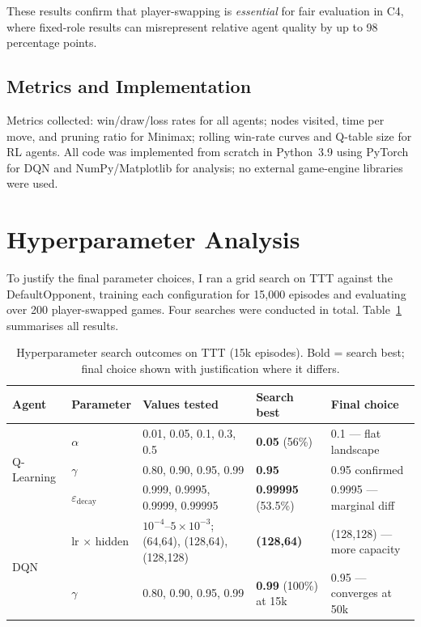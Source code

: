 \documentclass[11pt,a4paper]{article}
\begin{document}
These results confirm that player-swapping is \emph{essential} for fair evaluation in C4, where
fixed-role results can misrepresent relative agent quality by up to 98 percentage points.

\subsection{Metrics and Implementation}

Metrics collected: win/draw/loss rates for all agents; nodes visited, time per move, and pruning ratio for Minimax; rolling win-rate curves and Q-table size for RL agents. All code was implemented from scratch in Python~3.9 using PyTorch for DQN and NumPy/Matplotlib for analysis; no external game-engine libraries were used.

\section{Hyperparameter Analysis}
\label{sec:hyperparams}

To justify the final parameter choices, I ran a grid search on TTT against the DefaultOpponent,
training each configuration for 15,000 episodes and evaluating over 200 player-swapped games. Four
searches were conducted in total. Table~\ref{tab:hp_summary} summarises all results.

\begin{table}[H]
\centering
\caption{Hyperparameter search outcomes on TTT (15k episodes). Bold = search best; final choice
shown with justification where it differs.}
\label{tab:hp_summary}
\begin{tabular}{lllll}
\toprule
Agent & Parameter & Values tested & Search best & Final choice \\
\midrule
\multirow{3}{*}{Q-Learning}
  & $\alpha$                    & 0.01, 0.05, 0.1, 0.3, 0.5 & \textbf{0.05} (56\%) & 0.1 --- flat landscape \\
  & $\gamma$                    & 0.80, 0.90, 0.95, 0.99    & \textbf{0.95}        & 0.95 confirmed \\
  & $\varepsilon_{\text{decay}}$ & 0.999, 0.9995, 0.9999, 0.99995 & \textbf{0.99995} (53.5\%) & 0.9995 --- marginal diff \\
\midrule
\multirow{2}{*}{DQN}
  & lr $\times$ hidden & $10^{-4}$--$5\times10^{-3}$; (64,64), (128,64), (128,128) & \textbf{(128,64)} & (128,128) --- more capacity \\
  & $\gamma$           & 0.80, 0.90, 0.95, 0.99 & \textbf{0.99} (100\%) at 15k & 0.95 --- converges at 50k \\
\bottomrule
\end{tabular}
\end{table}
\end{document}
